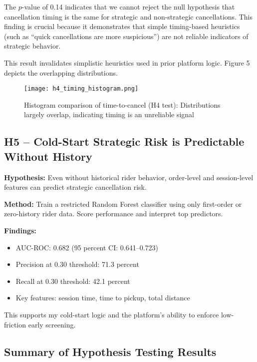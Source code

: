 \documentclass[12pt,letterpaper]{article}
\begin{document}
The $p$-value of 0.14 indicates that we cannot reject the null hypothesis that cancellation timing is the same for strategic and non-strategic cancellations. This finding is crucial because it demonstrates that simple timing-based heuristics (such as ``quick cancellations are more suspicious'') are not reliable indicators of strategic behavior.

This result invalidates simplistic heuristics used in prior platform logic. Figure 5 depicts the overlapping distributions.

\begin{figure}[H]
\centering
\texttt{[image: h4\_timing\_histogram.png]}
\caption{Histogram comparison of time-to-cancel (H4 test): Distributions largely overlap, indicating timing is an unreliable signal}
\label{fig:h4_timing}
\end{figure}

\subsection{H5 -- Cold-Start Strategic Risk is Predictable Without History}

\textbf{Hypothesis:} Even without historical rider behavior, order-level and session-level features can predict strategic cancellation risk.

\textbf{Method:} Train a restricted Random Forest classifier using only first-order or zero-history rider data. Score performance and interpret top predictors.

\textbf{Findings:}
\begin{itemize}
    \item AUC-ROC: 0.682 (95 percent CI: 0.641--0.723)
    \item Precision at 0.30 threshold: 71.3 percent
    \item Recall at 0.30 threshold: 42.1 percent
    \item Key features: session time, time to pickup, total distance
\end{itemize}

This supports my cold-start logic and the platform's ability to enforce low-friction early screening.

\subsection{Summary of Hypothesis Testing Results}
\end{document}
